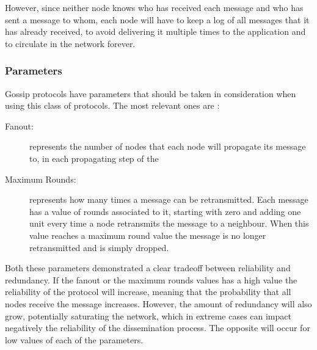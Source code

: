 However, since neither node knows who has received each message and who has sent a
message to whom, each node will have to keep a log of all messages that it has already
received, to avoid delivering it multiple times to the application and %
to circulate in the network forever.


\subsubsection{Parameters}
\label{subsubsec:gossip_parameters}
Gossip protocols have parameters that should be taken in consideration when using this
class of protocols. The most relevant ones are \cite{Leitao2012}:
\begin{description}
      \item[Fanout:] represents the number of nodes that each node will propagate its message
            to, in each propagating step of the %
      \item[Maximum Rounds:] represents how many times a message can be retransmitted. Each
            message has a value of rounds associated to it, starting with zero and adding one
            unit every time a node retransmits the message to a neighbour. When this value
            reaches a maximum round value the message is no longer retransmitted and is simply
            dropped.
\end{description}

Both these parameters demonstrated a clear tradeoff between reliability and redundancy. If
the fanout or the maximum rounds values has a high value the reliability of the protocol will
increase, meaning that the probability that all nodes receive the message increases. However,
the amount of redundancy will also grow, potentially saturating the network, which in extreme
cases can impact negatively the reliability of the dissemination process. The opposite will
occur for low values of each of the parameters.


